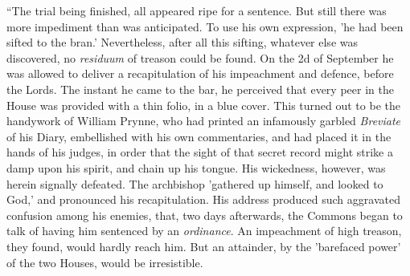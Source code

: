 ``The trial being finished, all
appeared ripe for a sentence. But still there was more impediment than
was anticipated. To use his own expression, 'he had been sifted to the
bran.' Nevertheless, after all this sifting, whatever else was
discovered, no \emph{residuum} of treason could be found. On the 2d of
September he was allowed to deliver a recapitulation of his impeachment
and defence, before the Lords. The instant he came to the bar, he
perceived that every peer in the House was provided with a thin folio,
in a blue cover. This turned out to be the handywork of William Prynne,
who had printed an infamously garbled \emph{Breviate} of his Diary,
embellished with his own commentaries, and had placed it in the hands of
his judges, in order that the sight of that secret record might strike a
damp upon his spirit, and chain up his tongue. His wickedness, however,
was herein signally defeated. The archbishop 'gathered up himself, and
looked to God,' and pronounced his recapitulation. His address produced
such aggravated confusion among his enemies, that, two days afterwards,
the Commons began to talk of having him sentenced by an \emph{ordinance}.
An impeachment of high treason, they found, would hardly reach him. But
an attainder, by the 'barefaced power' of the two Houses, would be
irresistible.

